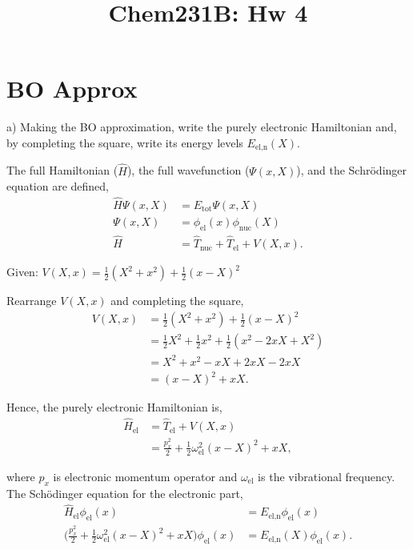 \documentclass{article}
\title{Chem231B: Hw 4} %
\begin{document}
\maketitle

\section*{\textbf{BO Approx}}

a) Making the BO approximation, write the purely electronic Hamiltonian and, by
completing the square, write its energy levels $E_{\text{el,n}}(X)$.

{\color{blue}
The full Hamiltonian ($\hat{H}$), the full wavefunction ($\Psi(x,X)$),
and the Schr\"odinger equation are defined,
\begin{align}
  \hat{H}\Psi(x,X) & = E_{\text{tot}}\Psi(x,X) \\
  \Psi(x,X) & = \phi_{\text{el}}(x)\phi_{\text{nuc}}(X) \\
  \hat{H} & = \hat{T}_{\text{nuc}} + \hat{T}_{\text{el}} + V(X,x).
\end{align}

Given: $V(X,x) = \frac{1}{2}(X^2+x^2) + \frac{1}{2}(x-X)^2$

Rearrange $V(X,x)$ and completing the square,
\begin{align}
  V(X,x) & = \frac{1}{2}(X^2+x^2) + \frac{1}{2}(x-X)^2 \nonumber \\
  & = \frac{1}{2}X^2+\frac{1}{2}x^2 + \frac{1}{2}(x^2-2xX+X^2) \nonumber \\
  & = X^2 + x^2 - xX + 2xX - 2xX \nonumber\\
  & = (x - X)^2 + xX.
\end{align}

Hence, the purely electronic Hamiltonian is,
\begin{align}
  \hat{H}_{\text{el}} & = \hat{T}_{\text{el}} + V(X,x) \nonumber\\
  & = \frac{p_x^2}{2} + \frac{1}{2}\omega_{\text{el}}^2(x - X)^2 + xX, \label{eqn:omega}
\end{align}

where $p_x$ is electronic momentum operator and $\omega_{\text{el}}$ is the vibrational
frequency. The Sch\"odinger equation for the electronic part,
\begin{align}
  \hat{H}_{\text{el}}\phi_{\text{el}}(x) & = E_{\text{el,n}}\phi_{\text{el}}(x) \\
  \Big(\frac{p_x^2}{2} + \frac{1}{2}\omega_{\text{el}}^2(x - X)^2 + xX\Big)\phi_{\text{el}}(x)
  & =E_{\text{el,n}}(X)\phi_{\text{el}}(x). \label{eqn:elec}
\end{align}

}
\end{document}
